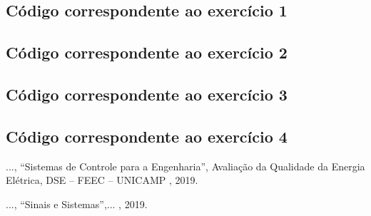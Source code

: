\documentclass[a4paper,12pt,oneside,openany,table,xcdraw]{article}
\begin{document}
\subsection{Código correspondente ao exercício 1} \label{anexo:ex1}


\vspace{0.3cm}
\subsection{Código correspondente ao exercício 2} \label{anexo:ex2}


\vspace{0.3cm}
\subsection{Código correspondente ao exercício 3} \label{anexo:ex3}


\vspace{0.3cm}
\subsection{Código correspondente ao exercício 4} \label{anexo:ex4}


\newpage
\begin{thebibliography}{9} 
    ...,
    “Sistemas de Controle para a Engenharia”, Avaliação da Qualidade da Energia Elétrica, DSE – FEEC – UNICAMP , 2019.
 
    ...,
    “Sinais e Sistemas”,... , 2019.

\end{thebibliography}
\end{document}
